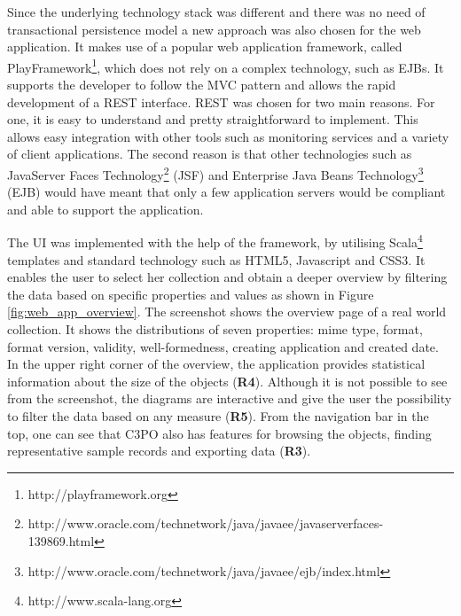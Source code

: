 Since the underlying technology stack was different and there was no need of transactional persistence model a new approach was also chosen for the web application. It makes use of a popular web application framework, called PlayFramework\footnote{http://playframework.org}, which does not rely on a complex technology, such as EJBs. It supports the developer to follow the MVC pattern and allows the rapid development of a REST \cite{Fielding:2000:ASD:932295} interface. REST was chosen for two main reasons. For one, it is easy to understand and pretty straightforward to implement. This allows easy integration with other tools such as monitoring services and a variety of client applications. The second reason is that other technologies such as JavaServer Faces Technology\footnote{http://www.oracle.com/technetwork/java/javaee/javaserverfaces-139869.html} (JSF) and Enterprise Java Beans Technology\footnote{http://www.oracle.com/technetwork/java/javaee/ejb/index.html} (EJB) would have meant that only a few application servers would be compliant and able to support the application.

The UI was implemented with the help of the framework, by utilising Scala\footnote{http://www.scala-lang.org} templates and standard technology such as HTML5, Javascript and CSS3. It enables the user to select her collection and obtain a deeper overview by filtering the data based on specific properties and values as shown in Figure \ref{fig:web_app_overview}. The screenshot shows the overview page of a real world collection. It shows the distributions of seven properties: mime type, format, format version, validity, well-formedness, creating application and created date. In the upper right corner of the overview, the application provides statistical information about the size of the objects (\textbf{R4}). Although it is not possible to see from the screenshot, the diagrams are interactive and give the user the possibility to filter the data based on any measure (\textbf{R5}). From the navigation bar in the top, one can see that C3PO also has features for browsing the objects, finding representative sample records and exporting data (\textbf{R3}).

